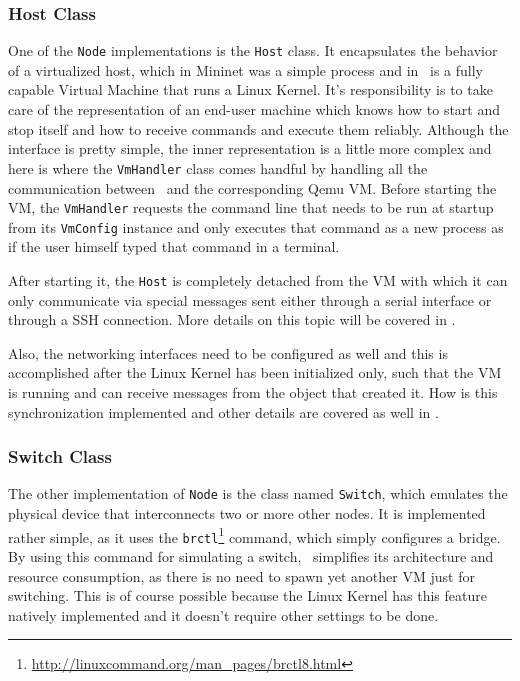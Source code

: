 \subsubsection{Host Class}
\label{sub-sub-sec:host-class}

One of the \texttt{Node} implementations is the \texttt{Host} class.
It encapsulates the behavior of a virtualized host, which in Mininet was a simple process and in \project\ is a fully capable Virtual Machine that runs a Linux Kernel.
It's responsibility is to take care of the representation of an end-user machine which knows how to start and stop itself and how to receive commands and execute them reliably.
Although the interface is pretty simple, the inner representation is a little more complex and here is where the \texttt{VmHandler} class comes handful by handling all the communication between \project\ and the corresponding Qemu VM.
Before starting the VM, the \texttt{VmHandler} requests the command line that needs to be run at startup from its \texttt{VmConfig} instance and only executes that command as a new process as if the user himself typed that command in a terminal.

After starting it, the \texttt{Host} is completely detached from the VM with which it can only communicate via special messages sent either through a serial interface or through a SSH connection.
More details on this topic will be covered in .

Also, the networking interfaces need to be configured as well and this is accomplished after the Linux Kernel has been initialized only, such that the VM is running and can receive messages from the object that created it.
How is this synchronization implemented and other details are covered as well in .

\subsubsection{Switch Class}
\label{sub-sub-sec:switch-class}

The other implementation of \texttt{Node} is the class named \texttt{Switch}, which emulates the physical device that interconnects two or more other nodes.
It is implemented rather simple, as it uses the \texttt{brctl}\footnote{\url{http://linuxcommand.org/man_pages/brctl8.html}} command, which simply configures a bridge.
By using this command for simulating a switch, \project\ simplifies its architecture and resource consumption, as there is no need to spawn yet another VM just for switching.
This is of course possible because the Linux Kernel has this feature natively implemented and it doesn't require other settings to be done.

